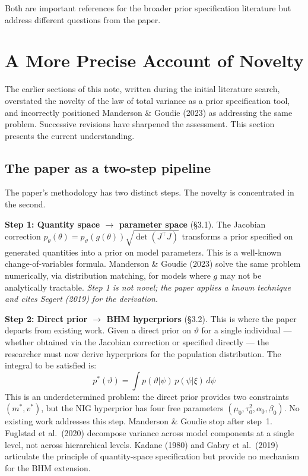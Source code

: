 \documentclass[12pt,a4paper]{article}
\begin{document}
Both are important references for the broader prior specification literature
but address different questions from the paper.


\section{A More Precise Account of Novelty}

The earlier sections of this note, written during the initial literature search,
overstated the novelty of the law of total variance as a prior specification
tool, and incorrectly positioned Manderson \& Goudie (2023) as addressing the
same problem. Successive revisions have sharpened the assessment. This section
presents the current understanding.

\subsection{The paper as a two-step pipeline}

The paper's methodology has two distinct steps. The novelty is concentrated
in the second.

\medskip
\noindent\textbf{Step 1: Quantity space $\to$ parameter space} (\S3.1). The
Jacobian correction $p_\theta(\theta) =
p_\vartheta(g(\theta))\sqrt{\det(J^\top J)}$ transforms a prior specified on
generated quantities into a prior on model parameters. This is a well-known
change-of-variables formula. Manderson \& Goudie (2023) solve the same problem
numerically, via distribution matching, for models where $g$ may not be
analytically tractable. \emph{Step 1 is not novel; the paper applies a known
technique and cites Segert (2019) for the derivation.}

\medskip
\noindent\textbf{Step 2: Direct prior $\to$ BHM hyperpriors} (\S3.2). This is
where the paper departs from existing work. Given a direct prior on $\vartheta$
for a single individual --- whether obtained via the Jacobian correction or
specified directly --- the researcher must now derive hyperpriors for the
population distribution. The integral to be satisfied is:
\[
  p^*(\vartheta) = \int p(\vartheta|\psi)\, p(\psi|\xi)\, d\psi
\]
This is an underdetermined problem: the direct prior provides two constraints
$(m^*, v^*)$, but the NIG hyperprior has four free parameters
$(\mu_0, \tau_0^2, \alpha_0, \beta_0)$. No existing work addresses this step.
Manderson \& Goudie stop after step~1. Fuglstad et al.\ (2020) decompose
variance across model components at a single level, not across hierarchical
levels. Kadane (1980) and Gabry et al.\ (2019) articulate the principle of
quantity-space specification but provide no mechanism for the BHM extension.
\end{document}
